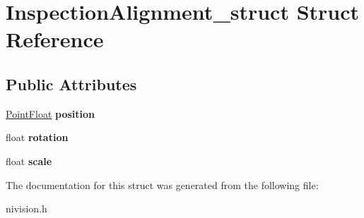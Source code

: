 \hypertarget{structInspectionAlignment__struct}{\section{\-Inspection\-Alignment\-\_\-struct \-Struct \-Reference}
\label{structInspectionAlignment__struct}
}
\subsection*{\-Public \-Attributes}
\begin{DoxyCompactItemize}
\item 
\hypertarget{structInspectionAlignment__struct_a27c10fafcca053eacdabaef800811bf9}{\hyperlink{structPointFloat__struct}{\-Point\-Float} {\bfseries position}}\label{structInspectionAlignment__struct_a27c10fafcca053eacdabaef800811bf9}

\item 
\hypertarget{structInspectionAlignment__struct_abb0263eeda30199299e9cea8e687126f}{float {\bfseries rotation}}\label{structInspectionAlignment__struct_abb0263eeda30199299e9cea8e687126f}

\item 
\hypertarget{structInspectionAlignment__struct_a0bb26230fab73bd3d8c8745ca8b94e61}{float {\bfseries scale}}\label{structInspectionAlignment__struct_a0bb26230fab73bd3d8c8745ca8b94e61}

\end{DoxyCompactItemize}


\-The documentation for this struct was generated from the following file\-:\begin{DoxyCompactItemize}
\item 
nivision.\-h\end{DoxyCompactItemize}
